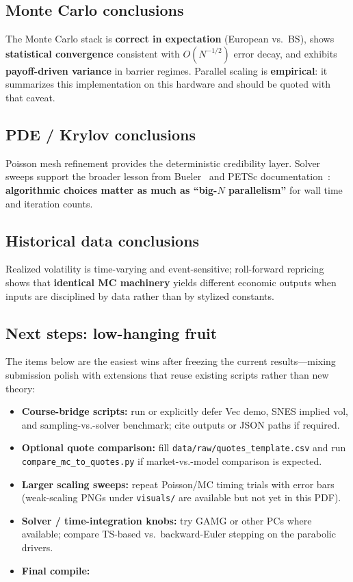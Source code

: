 \documentclass[11pt]{article}
\begin{document}
\subsection{Monte Carlo conclusions}
The Monte Carlo stack is \textbf{correct in expectation} (European vs.\ BS), shows
\textbf{statistical convergence} consistent with $O(N^{-1/2})$ error decay, and
exhibits \textbf{payoff-driven variance} in barrier regimes. Parallel scaling is
\textbf{empirical}: it summarizes this implementation on this hardware and should be
quoted with that caveat.

\subsection{PDE / Krylov conclusions}
Poisson mesh refinement provides the deterministic credibility layer. Solver sweeps
support the broader lesson from Bueler~\cite{bueler2020petsc} and PETSc
documentation~\cite{petsc-user-ref}: \textbf{algorithmic choices matter as much as
``big-$N$ parallelism''} for wall time and iteration counts.

\subsection{Historical data conclusions}
Realized volatility is time-varying and event-sensitive; roll-forward repricing
shows that \textbf{identical MC machinery} yields different economic outputs when
inputs are disciplined by data rather than by stylized constants.

\subsection{Next steps: low-hanging fruit}
\label{sec:remaining}
The items below are the easiest wins after freezing the current results---mixing
submission polish with extensions that reuse existing scripts rather than new
theory:
\begin{itemize}[leftmargin=*]
  
  \item \textbf{Course-bridge scripts:} run or explicitly defer Vec demo, SNES implied
  vol, and sampling-vs.-solver benchmark; cite outputs or JSON paths if required.
  \item \textbf{Optional quote comparison:} fill \texttt{data/raw/quotes\_template.csv}
  and run \texttt{compare\_mc\_to\_quotes.py} if market-vs.-model comparison is
  expected.
  \item \textbf{Larger scaling sweeps:} repeat Poisson/MC timing trials with error bars
  (weak-scaling PNGs under \texttt{visuals/} are available but not yet in this PDF).
  \item \textbf{Solver / time-integration knobs:} try GAMG or other PCs where available;
  compare TS-based vs.\ backward-Euler stepping on the parabolic drivers.
  \item \textbf{Final compile:} 
\end{itemize}
\end{document}
